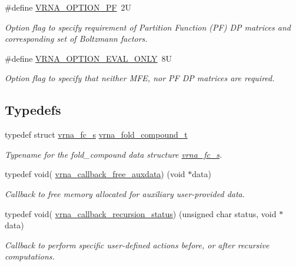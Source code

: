 \begin{DoxyCompactItemize}
\#define \hyperlink{group__fold__compound_gabfbadcddda3e74ce7f49035ef8f058f7}{V\+R\+N\+A\+\_\+\+O\+P\+T\+I\+O\+N\+\_\+\+P\+F}~2\+U
\begin{DoxyCompactList}\small\item\em Option flag to specify requirement of Partition Function (P\+F) D\+P matrices and corresponding set of Boltzmann factors. \end{DoxyCompactList}\item 
\#define \hyperlink{group__fold__compound_ga61469c423131552c8483229f8b6c7e0e}{V\+R\+N\+A\+\_\+\+O\+P\+T\+I\+O\+N\+\_\+\+E\+V\+A\+L\+\_\+\+O\+N\+L\+Y}~8\+U
\begin{DoxyCompactList}\small\item\em Option flag to specify that neither M\+F\+E, nor P\+F D\+P matrices are required. \end{DoxyCompactList}\end{DoxyCompactItemize}
\subsection*{Typedefs}
\begin{DoxyCompactItemize}
\item 
\hypertarget{group__fold__compound_ga1b0cef17fd40466cef5968eaeeff6166}{}typedef struct \hyperlink{group__fold__compound_structvrna__fc__s}{vrna\+\_\+fc\+\_\+s} \hyperlink{group__fold__compound_ga1b0cef17fd40466cef5968eaeeff6166}{vrna\+\_\+fold\+\_\+compound\+\_\+t}\label{group__fold__compound_ga1b0cef17fd40466cef5968eaeeff6166}

\begin{DoxyCompactList}\small\item\em Typename for the fold\+\_\+compound data structure \hyperlink{group__fold__compound_structvrna__fc__s}{vrna\+\_\+fc\+\_\+s}. \end{DoxyCompactList}\item 
typedef void( \hyperlink{group__fold__compound_ga3ae51bfd5fc3236652d1de4e3274b49b}{vrna\+\_\+callback\+\_\+free\+\_\+auxdata}) (void $\ast$data)
\begin{DoxyCompactList}\small\item\em Callback to free memory allocated for auxiliary user-\/provided data. \end{DoxyCompactList}\item 
typedef void( \hyperlink{group__fold__compound_ga4a4a0d838de6d18315bafc84f93f5cc0}{vrna\+\_\+callback\+\_\+recursion\+\_\+status}) (unsigned char status, void $\ast$data)
\begin{DoxyCompactList}\small\item\em Callback to perform specific user-\/defined actions before, or after recursive computations. \end{DoxyCompactList}\end{DoxyCompactItemize}
